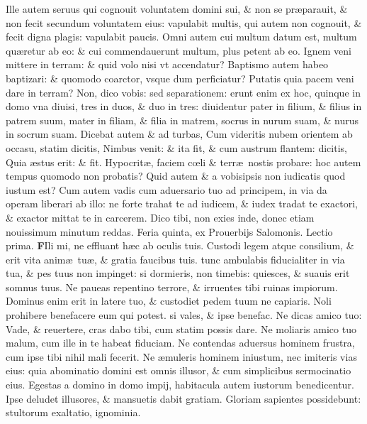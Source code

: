 \documentclass[a5paper,10pt]{book}
\def\rightmarginnote{%
	\lrmarginnote{\hskip\columnwidth \hskip -1em}}
\def\ae{æ}
\def\oe{œ}
\begin{document}
\begin{multicols*}{2}
Ille autem seruus qui cognouit voluntatem domini sui, \& non se pr\ae parauit, \& non fecit secundum voluntatem eius: vapulabit multis, qui autem non cognouit, \& fecit digna plagis: vapulabit paucis.
Omni autem cui multum datum est, multum qu\ae retur ab eo: \& cui commendauerunt multum, plus petent ab eo.
Ignem veni mittere in terram: \& quid volo nisi vt accendatur?
Baptismo autem habeo baptizari: \& quomodo coarctor, vsque dum perficiatur?
Putatis quia pacem veni dare in terram? Non, dico vobis: sed separationem: erunt enim ex hoc, quinque in domo vna diuisi, tres in duos, \& duo in tres: diuidentur pater in filium, \& filius in patrem suum, mater in filiam, \& filia in matrem, socrus in nurum suam, \& nurus in socrum suam.
Dicebat autem \& ad turbas, Cum videritis nubem orientem ab occasu, statim dicitis, Nimbus venit: \& ita fit, \& cum austrum flantem: dicitis, Quia \ae stus erit: \& fit.
Hypocrit\ae , faciem c\oe li \& terr\ae \ nostis probare: hoc autem tempus quomodo non probatis?
Quid autem \& a vobisipsis non iudicatis quod iustum est?
Cum autem vadis cum aduersario tuo ad principem, in via da operam liberari ab illo: ne forte trahat te ad iudicem, \& iudex tradat te exactori, \& exactor mittat te in carcerem.
Dico tibi, non exies inde, donec etiam nouissimum minutum reddas.
\newline {} \color{red} \hypertarget{THU-PRIMA-POST-ADV}{Feria quinta,} ex Prouerbijs Salomonis. \hfill Lectio prima. \color{black}
\vspace{-2.25em}
\lettrine[lines=2]{\bfseries F}{}Ili\rightmarginnote{ca. 3.} mi, ne effluant h\ae c ab oculis tuis.
Custodi legem atque consilium, \& erit vita anim\ae \ tu\ae , \& gratia faucibus tuis.
tunc ambulabis fiducialiter in via tua, \& pes tuus non impinget: si dormieris, non timebis: quiesces, \& suauis erit somnus tuus.
Ne paueas repentino terrore, \& irruentes tibi ruinas impiorum.
Dominus enim erit in latere tuo, \& custodiet pedem tuum ne capiaris.
Noli prohibere benefacere eum qui potest. si vales, \& ipse benefac.
Ne dicas amico tuo: Vade, \& reuertere, cras dabo tibi, cum statim possis dare.
Ne moliaris amico tuo malum, cum ille in te habeat fiduciam.
Ne contendas aduersus hominem frustra, cum ipse tibi nihil mali fecerit.
Ne \ae muleris hominem iniustum, nec imiteris vias eius: quia abominatio domini est omnis illusor, \& cum simplicibus sermocinatio eius.
Egestas a domino in domo impij, habitacula autem iustorum benedicentur.
Ipse deludet illusores, \& mansuetis dabit gratiam. Gloriam sapientes possidebunt: stultorum exaltatio, ignominia.

\end{multicols*}
\end{document}
